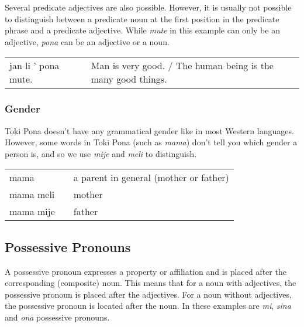 %
Several predicate adjectives are also possible.
However, it is usually not possible to distinguish between a predicate noun at the first position in the predicate phrase and a predicate adjective.
While \textit{mute} in this example can only be an adjective, \textit{pona} can be an adjective or a noun.

\begin{supertabular}{p{5,5cm}|ll}
    jan li ' pona mute. &  & Man is very good. / The human being is the many good things. \\
\end{supertabular}

\subsubsection*{Gender}
%
%
Toki Pona doesn't have any grammatical gender like in most Western languages.
However, some words in Toki Pona (such as \textit{mama}) don't tell you which gender a person is, and so we use \textit{mije} and \textit{meli} to distinguish.

\begin{supertabular}{p{5,5cm}|ll}
    mama      &  & a parent in general (mother or father) \\
    mama meli &  & mother                                 \\
    mama mije &  & father                                 \\
\end{supertabular}

%
\subsection*{Possessive Pronouns}
%

A possessive pronoun expresses a property or affiliation and is placed after the corresponding (composite) noun.
This means that for a noun with adjectives, the possessive pronoun is placed after the adjectives.
For a noun without adjectives, the possessive pronoun is located after the noun.
In these examples are \textit{mi}, \textit{sina} and \textit{ona} possessive pronouns.

